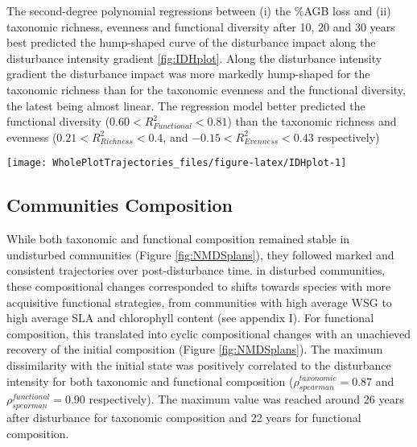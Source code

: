 \documentclass[fleqn,10pt]{ArtEcoFoG} %
\begin{document}
The second-degree polynomial regressions between (i) the \%AGB loss and
(ii) taxonomic richness, evenness and functional diversity after 10, 20
and 30 years best predicted the hump-shaped curve of the disturbance
impact along the disturbance intensity gradient \ref{fig:IDHplot}. Along
the disturbance intensity gradient the disturbance impact was more
markedly hump-shaped for the taxonomic richness than for the taxonomic
evenness and the functional diversity, the latest being almost linear.
The regression model better predicted the functional diversity
(\(0.60<R^2_{Functional}<0.81\)) than the taxonomic richness and
evenness (\(0.21<R^2_{Richness}<0.4\), and \(-0.15<R^2_{Evenness}<0.43\)
respectively)

\begin{figure*}

{\centering \texttt{[image: WholePlotTrajectories\_files/figure-latex/IDHplot-1]} 

}

\caption{Relationship between the initial \%AGB loss and community taxonmic richness \textbf{(a)}, taxonomic evenness \textbf{(b)} and functional diversity \textbf{(c)} at 10, 20 and 30 years after disturbance. Colors are treatments: green (control), blue (T1), orange (T2), red (T3) with shaded areas the credibility intervals }\label{fig:IDHplot}
\end{figure*}

\subsection{Communities Composition}\label{communities-composition}

While both taxonomic and functional composition remained stable in
undisturbed communities (Figure \ref{fig:NMDSplans}), they followed
marked and consistent trajectories over post-disturbance time. in
disturbed communities, these compositional changes corresponded to
shifts towards species with more acquisitive functional strategies, from
communities with high average WSG to high average SLA and chlorophyll
content (see appendix I). For functional composition, this translated
into cyclic compositional changes with an unachieved recovery of the
initial composition (Figure \ref{fig:NMDSplans}). The maximum
dissimilarity with the initial state was positively correlated to the
disturbance intensity for both taxonomic and functional composition
(\(\rho_{spearman}^{taxonomic}=0.87\) and
\(\rho_{spearman}^{functional}=0.90\) respectively). The maximum value
was reached around 26 years after disturbance for taxonomic composition
and 22 years for functional composition.
\end{document}
